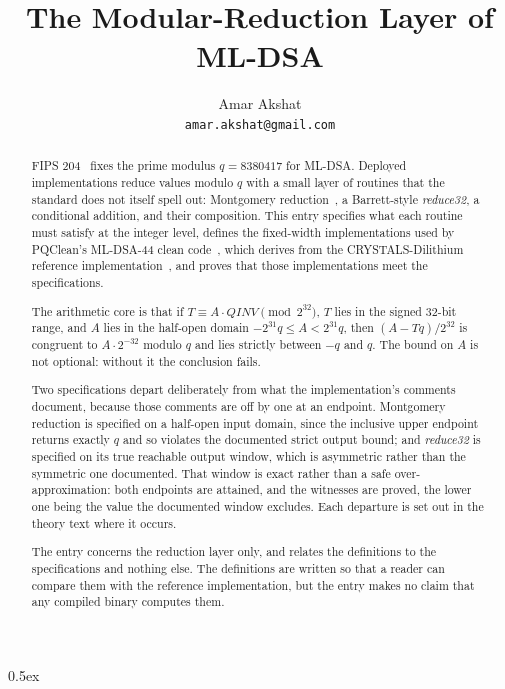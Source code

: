 \documentclass[11pt,a4paper]{article}
\begin{document}
\title{The Modular-Reduction Layer of ML-DSA}
\author{Amar Akshat \\ \texttt{amar.akshat@gmail.com}}
\maketitle

\begin{abstract}
FIPS 204~\cite{fips204} fixes the prime modulus $q = 8380417$ for ML-DSA. Deployed implementations
reduce values modulo $q$ with a small layer of routines that the standard does not itself spell out:
Montgomery reduction~\cite{montgomery1985}, a Barrett-style \emph{reduce32}, a conditional addition,
and their composition. This entry specifies what each routine must satisfy at the integer level,
defines the fixed-width implementations used by PQClean's ML-DSA-44 clean
code~\cite{pqclean_mldsa}, which derives from the CRYSTALS-Dilithium reference
implementation~\cite{dilithium_ref}, and proves that those implementations meet the specifications.

The arithmetic core is that if $T \equiv A \cdot \mathit{QINV} \pmod{2^{32}}$, $T$ lies in the
signed 32-bit range, and $A$ lies in the half-open domain $-2^{31}q \le A < 2^{31}q$, then
$(A - Tq)/2^{32}$ is congruent to $A \cdot 2^{-32}$ modulo $q$ and lies strictly between $-q$ and $q$.
The bound on $A$ is not optional: without it the conclusion fails.

Two specifications depart deliberately from what the implementation's comments document, because those
comments are off by one at an endpoint. Montgomery reduction is specified on a half-open input domain,
since the inclusive upper endpoint returns exactly $q$ and so violates the documented strict output
bound; and \emph{reduce32} is specified on its true reachable output window, which is asymmetric
rather than the symmetric one documented. That window is exact rather than a safe over-approximation:
both endpoints are attained, and the witnesses are proved, the lower one being the value the documented
window excludes. Each departure is set out in the theory text where it occurs.

The entry concerns the reduction layer only, and relates the definitions to the specifications and
nothing else. The definitions are written so that a reader can compare them with the reference
implementation, but the entry makes no claim that any compiled binary computes them.
\end{abstract}

\tableofcontents

\parindent 0pt\parskip 0.5ex





\end{document}
